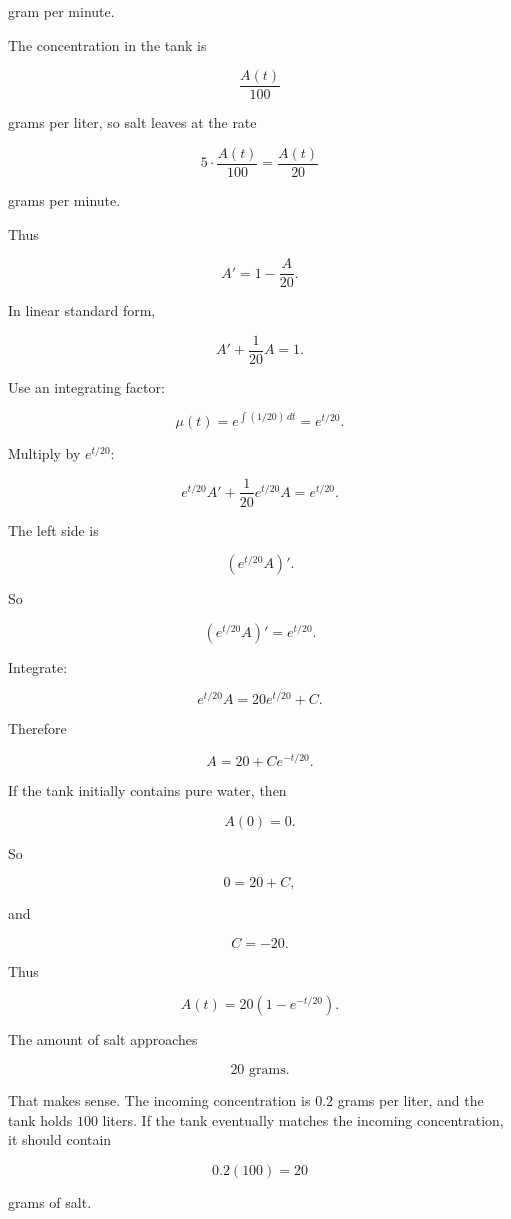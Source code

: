 gram per minute.

The concentration in the tank is

\[
\frac{A(t)}{100}
\]

grams per liter, so salt leaves at the rate

\[
5\cdot \frac{A(t)}{100}=\frac{A(t)}{20}
\]

grams per minute.

Thus

\[
A'=1-\frac{A}{20}.
\]

In linear standard form,

\[
\boxed{
A'+\frac1{20}A=1.
}
\]

Use an integrating factor:

\[
\mu(t)=e^{\int (1/20)\,dt}=e^{t/20}.
\]

Multiply by \(e^{t/20}\):

\[
e^{t/20}A'+\frac1{20}e^{t/20}A=e^{t/20}.
\]

The left side is

\[
(e^{t/20}A)'.
\]

So

\[
(e^{t/20}A)'=e^{t/20}.
\]

Integrate:

\[
e^{t/20}A=20e^{t/20}+C.
\]

Therefore

\[
A=20+Ce^{-t/20}.
\]

If the tank initially contains pure water, then

\[
A(0)=0.
\]

So

\[
0=20+C,
\]

and

\[
C=-20.
\]

Thus

\[
\boxed{
A(t)=20\left(1-e^{-t/20}\right).
}
\]

The amount of salt approaches

\[
20\text{ grams}.
\]

That makes sense.  The incoming concentration is \(0.2\) grams per liter, and the tank
holds \(100\) liters.  If the tank eventually matches the incoming concentration, it should
contain

\[
0.2(100)=20
\]

grams of salt.

